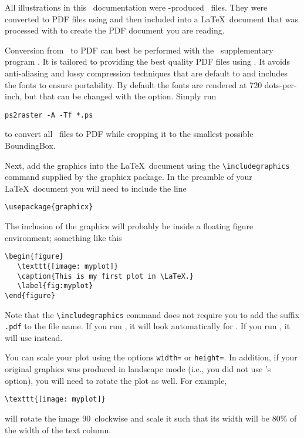 All illustrations in this \GMT\ documentation were \GMT-produced \PS\ files. They were converted to PDF files using  and then included into a \LaTeX\ document that was processed with  to create the PDF document you are reading.

Conversion from \PS\ to PDF can best be performed with the \GMT\ supplementary program . It is tailored to providing the best quality PDF files using . It avoids anti-aliasing and lossy compression techniques that are default to  and includes the fonts to ensure portability. By default the fonts are rendered at 720 dots-per-inch, but that can be changed with the  option. Simply run
\begin{verbatim}
ps2raster -A -Tf *.ps
\end{verbatim}
to convert all \PS\ files to PDF while cropping it to the smallest possible BoundingBox.

Next, add the graphics into the \LaTeX\ document using the \verb|\includegraphics| command supplied by the \textsf{graphicx} package. In the preamble of your \LaTeX\ document you will need to include the line
\begin{verbatim}
\usepackage{graphicx}
\end{verbatim}
The inclusion of the graphics will probably be inside a floating figure environment; something like this
\begin{verbatim}
\begin{figure}
   \texttt{[image: myplot]}
   \caption{This is my first plot in \LaTeX.}
   \label{fig:myplot}
\end{figure}
\end{verbatim}
Note that the \verb|\includegraphics| command does not require you to add the suffix \verb|.pdf| to the file name. If you run , it will look automatically for . If you run , it will use  instead.

You can scale your plot using the options \verb|width=| or \verb|height=|. In addition, if your original graphics was produced in landscape mode (i.e., you did not use \GMT's  option), you will need to rotate the plot as well. For example,
\begin{verbatim}
\texttt{[image: myplot]}
\end{verbatim}
will rotate the image 90\DS\ clockwise and scale it such that its width will be 80\% of the width of the text column.

